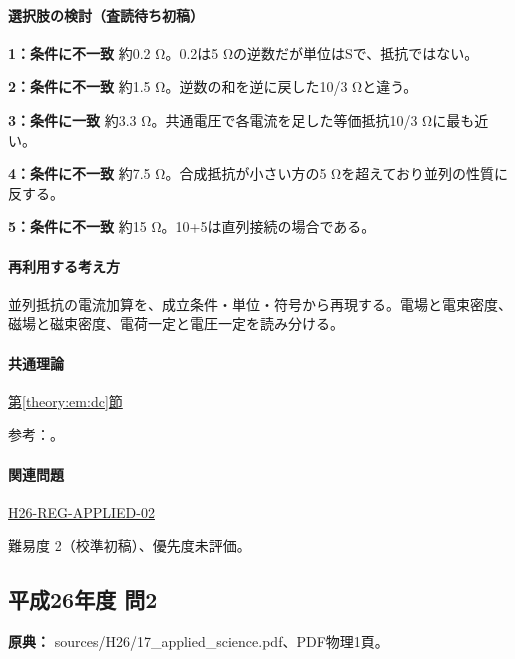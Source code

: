 \paragraph{選択肢の検討（査読待ち初稿）}\mbox{}\par

\noindent\textbf{1：条件に不一致} 約0.2 Ω。0.2は5 Ωの逆数だが単位はSで、抵抗ではない。\par

\noindent\textbf{2：条件に不一致} 約1.5 Ω。逆数の和を逆に戻した10/3 Ωと違う。\par

\noindent\textbf{3：条件に一致} 約3.3 Ω。共通電圧で各電流を足した等価抵抗10/3 Ωに最も近い。\par

\noindent\textbf{4：条件に不一致} 約7.5 Ω。合成抵抗が小さい方の5 Ωを超えており並列の性質に反する。\par

\noindent\textbf{5：条件に不一致} 約15 Ω。10+5は直列接続の場合である。\par

\paragraph{再利用する考え方} 並列抵抗の電流加算を、成立条件・単位・符号から再現する。電場と電束密度、磁場と磁束密度、電荷一定と電圧一定を読み分ける。

\paragraph{共通理論} \hyperref[theory:em:dc]{第\ref*{theory:em:dc}節}

\par 参考：\cite{mit_em07}。

\paragraph{関連問題} \hyperref[q:h26-reg-applied-02]{H26-REG-APPLIED-02}

\par 難易度 2（校準初稿）、優先度未評価。

\subsection{平成26年度 問2}
\label{q:h26-reg-applied-02}

\noindent\textbf{原典：} sources/H26/17\_applied\_science.pdf、PDF物理1頁。

